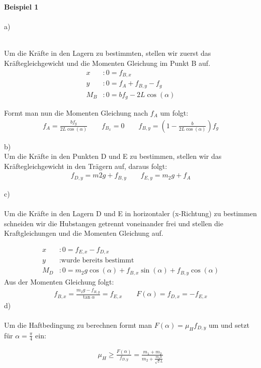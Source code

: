 %
\noindent
\textbf{Beispiel 1} \\ \\
a) 
	\begin{figure}[h]
		\centering
		
	\end{figure} \\
Um die Kräfte in den Lagern zu bestimmten, stellen wir zuerst das Kräftegleichgewicht und die Momenten Gleichung im Punkt B auf. 
\begin{align*}\label{key}
x&: 0=f_{B,x} \\
y&: 0 = f_A + f_{B,y} -f_g\\
M_B&:0=b f_g-2L \cos(\alpha)  
\end{align*}

\noindent
Formt man nun die Momenten Gleichung nach \(f_A\) um folgt: 
\begin{align*}
f_A = \frac{b f_g}{2L \cos(\alpha)} \qquad f_{B_x}=0 \qquad f_{B,y} = \left(1-\frac{b}{2L \cos(\alpha)}\right) f_g
\end{align*}
\begin{figure}[h]
	\centering
	
\end{figure}
b) \\
Um die Kräfte in den Punkten D und E zu bestimmen, stellen wir das Kräftegleichgewicht in den Trägern auf, daraus folgt: 
\begin{align*}
 f_{D,y} = m2 g + f_{B,y}\qquad	f_{E,y} = m_2 g + f_A 
\end{align*}

\begin{figure}[h]
	\centering
	
\end{figure}
\noindent
c)\\  \\ %
Um die Kräfte in den Lagern D und E in horizontaler (x-Richtung) zu bestimmen schneiden wir die Hubstangen getrennt voneinander frei und stellen die Kraftgleichungen und die Momenten Gleichung auf. 

\begin{align*}
	x&:  0 = f_{E,x} - f_{D,x}\\
	y&:  \text{wurde bereits bestimmt} \\ 
	M_D&: 0 = m_2 g \cos(\alpha) +f_{B,x} \sin(\alpha) + f_{B,y} \cos(\alpha)
\end{align*}
Aus der Momenten Gleichung  folgt: 
\begin{align*}
	f_{B,x} = \frac{m_2 g- f_{B,y}}{\tan{\alpha}} =f_{E,x} \qquad  F(\alpha) = f_{D,x} = -f_{E,x}
\end{align*}
\noindent 
d) \\ \\ 	
	Um die Haftbedingung zu berechnen formt man \(F(\alpha) = \mu_H f_{D,y}\) um und setzt für \(\alpha=\frac{\pi}{4}\) ein: 
	
	\begin{align*}
		\mu_H \geq \frac{F(\alpha)}{f_{D,y}} = \frac{m_1+m_2}{m_2+\frac{m_1 b}{\sqrt2L}}
	\end{align*}
	
%